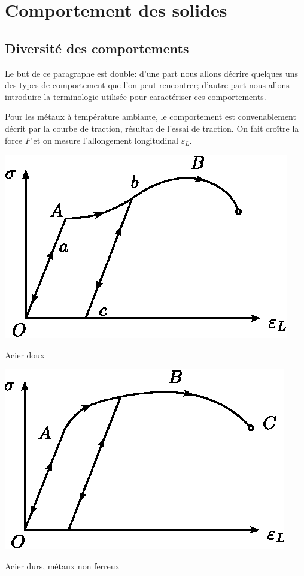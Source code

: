 \section{Comportement des solides}
\subsection{Diversité des comportements}
Le but de ce paragraphe est double: d'une part nous allons décrire quelques uns des types de comportement que l'on peut rencontrer; d'autre part nous allons introduire la terminologie utilisée pour caractériser ces comportements.

Pour les métaux à température ambiante, le comportement est convenablement décrit par la courbe de traction, résultat de l'essai de traction.
On fait croître la force $F$ et on mesure l'allongement longitudinal $\varepsilon_L$.
\begin{multicols}{2}
    \begin{center}
        \includegraphics{../images/T1_Ch04-0011}

        Acier doux
    \end{center}
    \columnbreak
    \begin{center}
        \includegraphics{../images/T1_Ch04-0012}

        Acier durs, métaux non ferreux
    \end{center}
\end{multicols}
